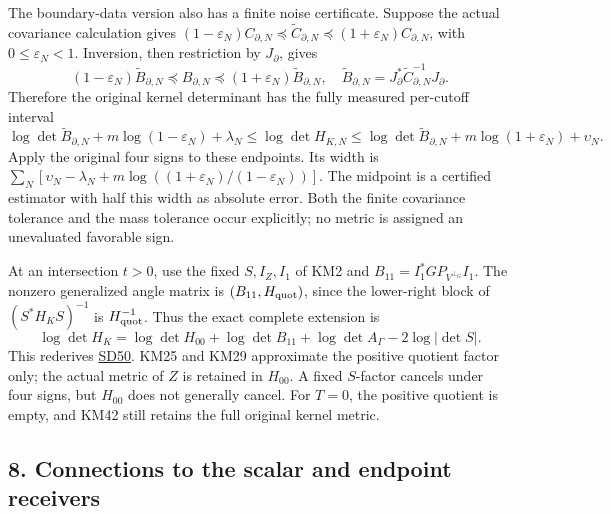 \documentclass[11pt]{article}
\begin{document}
The boundary-data version also has a finite noise certificate. Suppose the actual covariance calculation gives \((1-\varepsilon_N)C_{\partial,N}\preceq\widetilde C_{\partial,N}
\preceq(1+\varepsilon_N)C_{\partial,N}\), with \(0\le\varepsilon_N<1\). Inversion, then restriction by \(J_\partial\), gives \[
 (1-\varepsilon_N)\widetilde B_{\partial,N}
 \preceq B_{\partial,N}\preceq
 (1+\varepsilon_N)\widetilde B_{\partial,N},
 \quad
 \widetilde B_{\partial,N}=J_\partial^*\widetilde C_{\partial,N}^{-1}J_\partial.
\] Therefore the original kernel determinant has the fully measured per-cutoff interval \[
 \log\det\widetilde B_{\partial,N}
 +m\log(1-\varepsilon_N)+\lambda_N
 \le\log\det H_{K,N}\le
 \log\det\widetilde B_{\partial,N}
 +m\log(1+\varepsilon_N)+\upsilon_N .
 \tag{KM41}
\] Apply the original four signs to these endpoints. Its width is \(\sum_N[\upsilon_N-\lambda_N+
m\log((1+\varepsilon_N)/(1-\varepsilon_N))]\). The midpoint is a certified estimator with half this width as absolute error. Both the finite covariance tolerance and the mass tolerance occur explicitly; no metric is assigned an unevaluated favorable sign.

At an intersection \(t>0\), use the fixed \(S,I_Z,I_1\) of KM2 and \(B_{11}=I_1^*GP_{V^{\perp_G}}I_1\). The nonzero generalized angle matrix is \((B_{11},H_{\rm quot})\), since the lower-right block of \((S^*H_KS)^{-1}\) is \(H_{\rm quot}^{-1}\). Thus the exact complete extension is \[
 \log\det H_K=
 \log\det H_{00}+\log\det B_{11}
 +\log\det A_\Gamma-2\log|\det S|.
 \tag{KM42}
\] This rederives \href{https://github.com/KokunoYumeto/zeta-function-research-reader/blob/e40b46fde72c245dd79ef5691f59c21d6cbf0c75/workbenches/splitzero-tandem/continuations/20260922-original-observation-recovery/SCALAR_RECOVERY_PROOFS.md\#L530}{SD50}. KM25 and KM29 approximate the positive quotient factor only; the actual metric of \(Z\) is retained in \(H_{00}\). A fixed \(S\)-factor cancels under four signs, but \(H_{00}\) does not generally cancel. For \(T=0\), the positive quotient is empty, and KM42 still retains the full original kernel metric.

\subsection{8. Connections to the scalar and endpoint receivers}\label{connections-to-the-scalar-and-endpoint-receivers}
\end{document}
